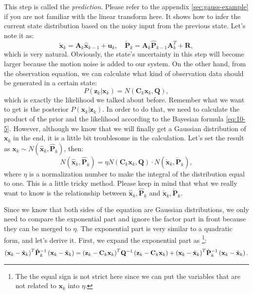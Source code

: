This step is called the \textit{prediction}. Please refer to the appendix \ref{sec:gauss-example} if you are not familiar with the linear transform here. It shows how to infer the current state distribution based on the noisy input from the previous state. Let's note it as:
\begin{equation}
	\check{\mathbf{x}}_k = {\mathbf{A}_k {{\hat{\mathbf{x}}}_{k - 1}} + {\mathbf{u}_k}}, \quad \check{\mathbf{P}}_k = {\mathbf{A}_k \hat{\mathbf{P}}_{k-1} { \mathbf{A}^T_k} + \mathbf{R}},
\end{equation}
which is very natural. Obviously, the state's uncertainty in this step will become larger because the motion noise is added to our system. On the other hand, from the observation equation, we can calculate what kind of observation data should be generated in a certain state:
\begin{equation}
	P\left( {{\mathbf{z}_k}|{\mathbf{x}_k}} \right) = N\left( {{\mathbf{C}_k}{\mathbf{x}_k},\mathbf{Q}} \right) ,
\end{equation}
which is exactly the likelihood we talked about before. Remember what we want to get is the posterior $P\left( {{\mathbf{x}_k}|{\mathbf{z}_k}} \right) $. In order to do that, we need to calculate the product of the prior and the likelihood according to the Bayesian formula \eqref{eq:10-5}. However, although we know that we will finally get a Gaussian distribution of $\mathbf{x}_k$ in the end, it is a little bit troublesome in the calculation. Let's set the result as $\mathbf{x}_k \sim N(\mathbf{\hat{x}}_k, \mathbf{\hat{P}}_k )$, then:
\begin{equation}
	N(\mathbf{\hat{x}}_k, \mathbf{\hat{P}}_k ) = \eta N\left( {{\mathbf{C}_k}{\mathbf{x}_k},\mathbf{Q}} \right) \cdot N( \mathbf{\check{x}}_k, \mathbf{\check{P}}_k),
\end{equation}
where $\eta$ is a normalization number to make the integral of the distribution equal to one. This is a little tricky method. Please keep in mind that what we really want to know is the relationship between $\hat{\mathbf{x}}_k, \hat{\mathbf{P}}_k$ and $\check{\mathbf{x}}_k, \check{\mathbf{P}}_k$. 

Since we know that both sides of the equation are Gaussian distributions, we only need to compare the exponential part and ignore the factor part in front because they can be merged to $\eta$. The exponential part is very similar to a quadratic form, and let's derive it. First, we expand the exponential part as \footnote{ The the equal sign is not strict here since we can put the variables that are not related to $\mathbf{x}_k$ into $\eta$. }:
\begin{equation}
	\small
	{\left( {{\mathbf{x}_k} - {{\hat{\mathbf{x}}}_k}} \right)^T}\hat{\mathbf{P}}_k^{ - 1}\left( {{\mathbf{x}_k} - {{\hat{\mathbf{x}}}_k}} \right) = {\left( {{\mathbf{z}_k} - {\mathbf{C}_k} {\mathbf{x}_k}} \right)^T}{\mathbf{Q}^{ - 1}}\left( {{\mathbf{z}_k} - {\mathbf{C}_k}{\mathbf{x}_k}} \right) + {\left( {{\mathbf{x}_k} - {{\check{\mathbf{x}}}_k}} \right)^T}\check{\mathbf{P}}_k^{ - 1}\left( {\mathbf{x}_k - {{\check{\mathbf{x}}}_k}} \right).
\end{equation}

